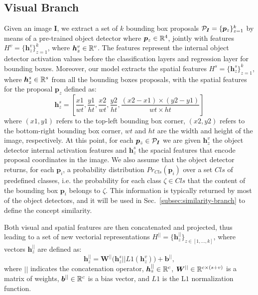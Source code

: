 \subsection{Visual Branch}
\label{subsec:visual-branch}

Given an image $\bm{I}$, we extract a set of $k$ bounding box
proposals $\mathcal{P}_{\bm{I}} = \{ \bm{p}_z \}^k_{z=1}$ by means of a
pre-trained object detector where $\bm{p}_z \in \mathbb{R}^4$, jointly with
features $H^v = \{ \bm{h}^v_z \}^k_{z=1}$, where $\bm{h}^v_z \in
\mathbb{R}^v$. The features represent the internal object detector
activation values before the classification layers and regression
layer for bounding boxes. Moreover, our model extracts the spatial
features $H^s = \{ \bm{h}^s_z \}^k_{z=1}$, where $\bm{h}^s_z \in
\mathbb{R}^s$ from all the bounding boxes proposals, with the spatial
features for the proposal $\bm{p}_z$ defined as:
\begin{equation}
  \bm{h}^s_z = \left[ \frac{x1}{wt}, \frac{y1}{ht}, \frac{x2}{wt}, \frac{y2}{ht}, \frac{(x2 - x1) \times (y2 - y1)}{wt \times ht}  \right]
\end{equation}
where $(x1, y1)$ refers to the top-left bounding box corner, $(x2,
y2)$ refers to the bottom-right bounding box corner, $wt$ and $ht$ are
the width and height of the image, respectively. At this point, for
each $\bm{p}_z \in \mathcal{P}_{\bm{I}}$ we are given $\bm{h}^v_z$ the
object detector internal activation features and $\bm{h}^s_z$ the
spacial features that encode proposal coordinates in the image. We
also assume that the object detector returns, for each $\bm{p}_i$, a
probability distribution $Pr_{Cls}(\bm{p}_i)$ over a set $Cls$ of
predefined classes, i.e. the probability for each class $\zeta \in
Cls$ that the content of the bounding box $\bm{p}_i$ belongs to
$\zeta$. This information is typically returned by most of the object
detectors, and it will be used in Sec.~\ref{subsec:similarity-branch}
to define the concept similarity.

Both visual and spatial features are then concatenated and projected,
thus leading to a set of new vectorial representations $H^{||} = \{
\bm{h}^{||}_{z} \}_{z \in [1, \ldots, k]}$, where vectors
$\bm{h}^{||}_{z}$ are defined as:
\begin{equation}
  \bm{h}^{||}_{z} = \bm{W}^{||} \big( \bm{h}^s_z || L1(\bm{h}^v_z) \big) + \bm{b}^{||},
  \label{eq:h-par-jz}
\end{equation}
where $||$ indicates the concatenation operator, $\bm{h}^{||}_{z} \in
\mathbb{R}^c$, $\bm{W}^{||} \in \mathbb{R}^{c \times (s + v)}$ is a matrix of
weights, $\bm{b}^{||} \in \mathbb{R}^c$ is a bias vector, and $L1$ is the
L$1$ normalization function.



